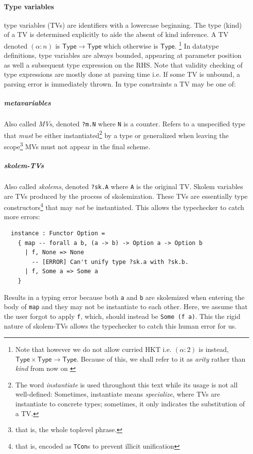 \documentclass[a4paper, 11pt]{article}
\theoremstyle{remark}\newtheorem*{remark}{Remark}
\theoremstyle{definition}\newtheorem*{definition}{Definition}
\begin{document}
\paragraph{Type variables} type variables (TVs) are identifiers with a lowercase beginning.
The type (kind) of a TV is determined explicitly to aide the absent of kind inference. A TV denoted
\((\alpha : n)\) is \(\mathsf{Type}\to \mathsf{Type}\) which otherwise is \(\mathsf{Type}\).%
\footnote{Note that however we do not allow curried HKT i.e. \((\alpha : 2)\) is instead, \(\mathsf{Type}\times\mathsf{Type}\to\mathsf{Type}\).
Because of this, we shall refer to it as \emph{arity} rather than \emph{kind} from now on \label{fn:HKT}}
In datatype definitions, type variables are always bounded, appearing at parameter position as well a
subsequent type expression on the RHS.
Note that validity checking of type expressions are mostly done at parsing time i.e. If some TV is unbound, a parsing error is immediately thrown.
In type constraints a TV may be one of:
\subparagraph{metavariables} Also called \emph{MVs}, denoted \texttt{?m.N} where \texttt{N} is a counter. Refers to a unspecified type that
\emph{must} be either instantiated\footnote{
  The word \emph{instantiate} is used throughout this text while its usage is not all well-defined:
  Sometimes, instantiate means \emph{specialize}, where TVs are instantiate to concrete types;
  sometimes, it only indicates the substitution of a TV.
}
by a type or generalized when leaving
the scope\footnote{that is, the whole toplevel phrase.} MVs must not appear in the final scheme.
\subparagraph{skolem-TVs} Also called \emph{skolems}, denoted \texttt{?sk.A} where \texttt{A} is the original TV. Skolem variables are TVs produced by the process of skolemization. These TVs are essentially
type constructors\footnote{that is, encoded as \texttt{TCon}s to prevent illicit unification}
that may \emph{not} be instantiated. This allows the typechecker to catch more errors:
\begin{verbatim}
  instance : Functor Option =
    { map -- forall a b, (a -> b) -> Option a -> Option b
      | f, None => None
        -- [ERROR] Can't unify type ?sk.a with ?sk.b.
      | f, Some a => Some a
    }
\end{verbatim}

Results in a typing error because both \texttt{a} and \texttt{b} are skolemized when entering
the body of \texttt{map} and they may not be instantiate to each other. Here, we assume that
the user forgot to apply \texttt{f}, which, should instead be \texttt{Some (f a)}. This
the rigid nature of skolem-TVs allows the typechecker to catch this human error for us.
\end{document}
